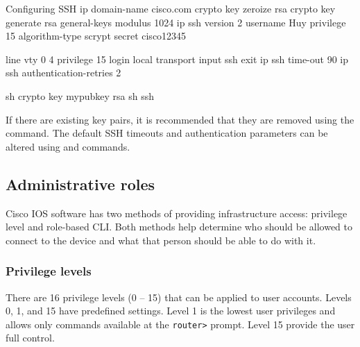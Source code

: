 %

\begin{sexylisting}{Configuring SSH}
ip domain-name cisco.com
crypto key zeroize rsa
crypto key generate rsa general-keys modulus 1024
ip ssh version 2
username Huy privilege 15 algorithm-type scrypt secret cisco12345

line vty 0 4
	privilege 15
  login local
  transport input ssh
  exit
ip ssh time-out 90
ip ssh authentication-retries 2

sh crypto key mypubkey rsa
sh ssh
\end{sexylisting}

If there are existing key pairs, it is recommended that they are removed using the  command. The default SSH timeouts and authentication parameters can be altered using  and  commands.

\subsection{Administrative roles}

Cisco IOS software has two methods of providing infrastructure access: privilege level and role-based CLI. Both methods help determine who should be allowed to connect to the device and what that person should be able to do with it.

\subsubsection{Privilege levels}

There are 16 privilege levels (0 -- 15) that can be applied to user accounts. Levels 0, 1, and 15 have predefined settings. Level 1 is the lowest user privileges and allows only commands available at the \verb|router>| prompt. Level 15 provide the user full control.\\


